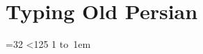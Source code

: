 \section{Typing Old Persian}\cite{TypePersian}

\begin{multicols}{4}
    =32
    \loop\ifnum{}<125
    \advance{} 1
    \hbox{\hbox to 1em{\hss}\hbox{\oldpersian{}}}
    \repeat
\end{multicols}
